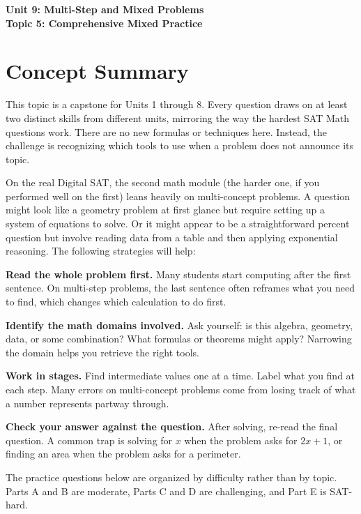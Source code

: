 \documentclass[14pt]{extarticle}
\begin{document}
\raggedright
{}

\begin{center}
    \LARGE \textbf{Unit 9: Multi-Step and Mixed Problems} \\[6pt]
    \Large \textbf{Topic 5: Comprehensive Mixed Practice}
\end{center}

\vspace{1em}

\section*{Concept Summary}

This topic is a capstone for Units 1 through 8. Every question draws on at least two distinct skills from different units, mirroring the way the hardest SAT Math questions work. There are no new formulas or techniques here. Instead, the challenge is recognizing which tools to use when a problem does not announce its topic.

On the real Digital SAT, the second math module (the harder one, if you performed well on the first) leans heavily on multi-concept problems. A question might look like a geometry problem at first glance but require setting up a system of equations to solve. Or it might appear to be a straightforward percent question but involve reading data from a table and then applying exponential reasoning. The following strategies will help:

\textbf{Read the whole problem first.} Many students start computing after the first sentence. On multi-step problems, the last sentence often reframes what you need to find, which changes which calculation to do first.

\textbf{Identify the math domains involved.} Ask yourself: is this algebra, geometry, data, or some combination? What formulas or theorems might apply? Narrowing the domain helps you retrieve the right tools.

\textbf{Work in stages.} Find intermediate values one at a time. Label what you find at each step. Many errors on multi-concept problems come from losing track of what a number represents partway through.

\textbf{Check your answer against the question.} After solving, re-read the final question. A common trap is solving for \(x\) when the problem asks for \(2x + 1\), or finding an area when the problem asks for a perimeter.

The practice questions below are organized by difficulty rather than by topic. Parts A and B are moderate, Parts C and D are challenging, and Part E is SAT-hard.
\end{document}
